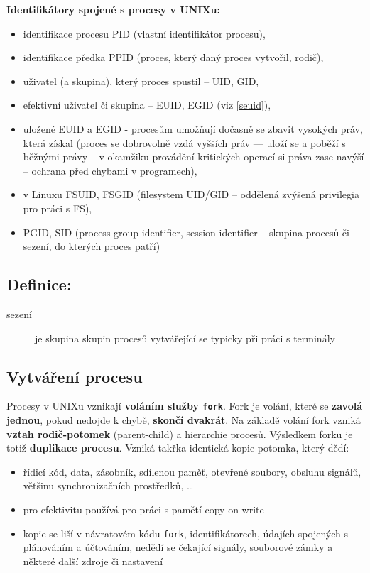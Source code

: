 \documentclass[a4paper, 11pt]{article}
\newcommand{\tcmd}[1]{\texttt{#1}}
\begin{document}
\textbf{Identifikátory spojené s procesy v UNIXu:}
\begin{itemize}
    \item identifikace procesu PID (vlastní identifikátor procesu),
    \item identifikace předka PPID (proces, který daný proces vytvořil, rodič),
    \item uživatel (a skupina), který proces spustil -- UID, GID,
    \item efektivní uživatel či skupina -- EUID, EGID (viz \ref{seuid}),
    \item uložené EUID a EGID - procesům umožňují dočasně se zbavit vysokých práv, která získal (proces se dobrovolně vzdá vyšších práv --- uloží se a poběží s běžnými právy -- v okamžiku provádění kritických operací si práva zase navýší -- ochrana před chybami v programech),
    \item v Linuxu FSUID, FSGID (filesystem UID/GID -- oddělená zvýšená privilegia pro práci s FS),
    \item PGID, SID (process group identifier, session identifier -- skupina procesů či sezení, do kterých proces patří)
\end{itemize}
 
\subsection*{Definice:}
\begin{description}
\item[sezení] je skupina skupin procesů vytvářející se typicky při práci s terminály
\end{description}

\subsection{Vytváření procesu} \label{fork}
Procesy v UNIXu vznikají \textbf{voláním služby \tcmd{fork}}. Fork je volání, které se \textbf{zavolá jednou}, pokud nedojde k chybě, \textbf{skončí dvakrát}. Na základě volání fork vzniká \textbf{vztah rodič-potomek} (parent-child) a hierarchie procesů. Výsledkem forku je totiž \textbf{duplikace procesu}. Vzniká takřka identická kopie potomka, který dědí:

\begin{itemize}
    \item řídicí kód, data, zásobník, sdílenou paměť, otevřené soubory, obsluhu signálů, většinu synchronizačních prostředků, \ldots
    \item pro efektivitu používá pro práci s pamětí copy-on-write
    \item kopie se liší v návratovém kódu \tcmd{fork}, identifikátorech, údajích spojených s plánováním a účtováním, nedědí se čekající signály, souborové zámky a některé další zdroje či nastavení
\end{itemize}
 
\end{document}
